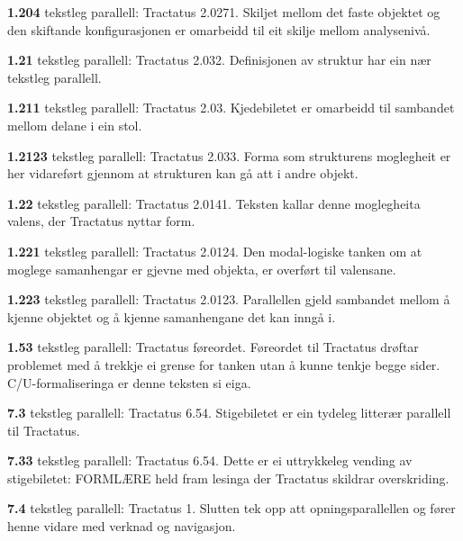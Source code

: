 \begin{widebody}
\noindent\hypertarget{kjeldenotat-1.204}{}\textbf{1.204} tekstleg parallell: Tractatus 2.0271. Skiljet mellom det faste objektet og den skiftande konfigurasjonen er omarbeidd til eit skilje mellom analysenivå.\par\medskip
\noindent\hypertarget{kjeldenotat-1.21}{}\textbf{1.21} tekstleg parallell: Tractatus 2.032. Definisjonen av struktur har ein nær tekstleg parallell.\par\medskip
\noindent\hypertarget{kjeldenotat-1.211}{}\textbf{1.211} tekstleg parallell: Tractatus 2.03. Kjedebiletet er omarbeidd til sambandet mellom delane i ein stol.\par\medskip
\noindent\hypertarget{kjeldenotat-1.2123}{}\textbf{1.2123} tekstleg parallell: Tractatus 2.033. Forma som strukturens moglegheit er her vidareført gjennom at strukturen kan gå att i andre objekt.\par\medskip
\noindent\hypertarget{kjeldenotat-1.22}{}\textbf{1.22} tekstleg parallell: Tractatus 2.0141. Teksten kallar denne moglegheita valens, der Tractatus nyttar form.\par\medskip
\noindent\hypertarget{kjeldenotat-1.221}{}\textbf{1.221} tekstleg parallell: Tractatus 2.0124. Den modal-logiske tanken om at moglege samanhengar er gjevne med objekta, er overført til valensane.\par\medskip
\noindent\hypertarget{kjeldenotat-1.223}{}\textbf{1.223} tekstleg parallell: Tractatus 2.0123. Parallellen gjeld sambandet mellom å kjenne objektet og å kjenne samanhengane det kan inngå i.\par\medskip
\noindent\hypertarget{kjeldenotat-1.53}{}\textbf{1.53} tekstleg parallell: Tractatus føreordet. Føreordet til Tractatus drøftar problemet med å trekkje ei grense for tanken utan å kunne tenkje begge sider. C/U-formaliseringa er denne teksten si eiga.\par\medskip
\noindent\hypertarget{kjeldenotat-7.3}{}\textbf{7.3} tekstleg parallell: Tractatus 6.54. Stigebiletet er ein tydeleg litterær parallell til Tractatus.\par\medskip
\noindent\hypertarget{kjeldenotat-7.33}{}\textbf{7.33} tekstleg parallell: Tractatus 6.54. Dette er ei uttrykkeleg vending av stigebiletet: FORMLÆRE held fram lesinga der Tractatus skildrar overskriding.\par\medskip
\noindent\hypertarget{kjeldenotat-7.4}{}\textbf{7.4} tekstleg parallell: Tractatus 1. Slutten tek opp att opningsparallellen og fører henne vidare med verknad og navigasjon.\par\medskip

\end{widebody}
